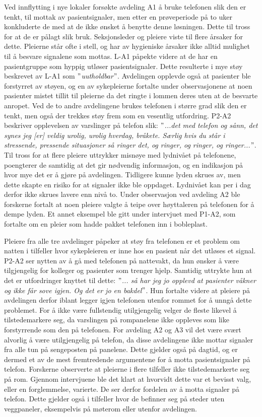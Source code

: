 \noindent
Ved innflytting i nye lokaler forsøkte avdeling A1 å bruke telefonen slik den er tenkt, til mottak av pasientsignaler, men etter en prøveperiode på to uker konkluderte de med at de ikke ønsket å benytte denne løsningen. Dette til tross for at de er pålagt slik bruk. Seksjonsleder og pleiere viste til flere årsaker for dette. Pleierne står ofte i stell, og har av hygieniske årsaker ikke alltid mulighet til å besvare signalene som mottas. L-A1 påpekte videre at de har en pasientgruppe som hyppig utløser pasientsignaler. Dette resulterte i mye støy beskrevet av L-A1 som \textit{$"$uutholdbar$"$}. Avdelingen opplevde også at pasienter ble forstyrret av støyen, og en av sykepleierne fortalte under observasjonene at noen pasienter mistet tillit til pleierne da det ringte i lommen deres uten at de besvarte anropet. Ved de to andre avdelingene brukes telefonen i større grad slik den er tenkt, men også der trekkes støy frem som en vesentlig utfordring. P2-A2 beskriver opplevelsen av varslinger på telefon slik: \textit{ $"$...det med telefon og sånn, det synes jeg [er] veldig urolig, urolig hverdag, bråkete. Særlig hvis du står i stressende, pressende situasjoner så ringer det, og ringer, og ringer, og ringer...$"$}. Til tross for at flere pleiere uttrykker misnøye med lydnivået på telefonene, poengterer de samtidig at det gir nødvendig informasjon, og en indikasjon på hvor mye det er å gjøre på avdelingen. Tidligere kunne lyden skrues av, men dette skapte en risiko for at signaler ikke ble oppdaget. Lydnivået kan per i dag derfor ikke skrues lavere enn nivå to. Under observasjon ved avdeling A2 ble forskerne fortalt at noen pleiere valgte å teipe over høyttaleren på telefonen for å dempe lyden. Et annet eksempel ble gitt under intervjuet med P1-A2, som fortalte om en pleier som hadde pakket telefonen inn i bobleplast.

\noindent
Pleiere fra alle tre avdelinger påpeker at støy fra telefonen er et problem om natten i tilfeller hvor sykepleieren er inne hos en pasient når det utløses et signal. P2-A2 ser nytten av å gå med telefonen på nattevakt, da hun ønsker å være tilgjengelig for kolleger og pasienter som trenger hjelp. Samtidig uttrykte hun at det er utfordringer knyttet til dette: \textit{ $"$... så har jeg jo opplevd at pasienter våkner og ikke får sove igjen. Og det er jo en bakdel$"$}. Hun fortalte videre at pleiere på avdelingen derfor iblant legger igjen telefonen utenfor rommet for å unngå dette problemet. For å ikke være fullstendig utilgjengelig velger de fleste likevel å tilstedemarkere seg, da varslingen på rompanelene ikke oppleves som like forstyrrende som den på telefonen. For avdeling A2 og A3 vil det være svært alvorlig å være utilgjengelig på telefon, da disse avdelingene ikke mottar signaler fra alle tun på sengeposten på panelene. Dette gjelder også på dagtid, og er dermed et av de mest fremtredende argumentene for å motta pasientsignaler på telefon. Forskerne observerte at pleierne i flere tilfeller ikke tilstedemarkerte seg på rom. Gjennom intervjuene ble det klart at hvorvidt dette var et bevisst valg, eller en forglemmelse, varierte. De ser derfor fordelen av å motta signaler på telefon. Dette gjelder også i tilfeller hvor de befinner seg på steder uten veggpaneler, eksempelvis på møterom eller utenfor avdelingen.

